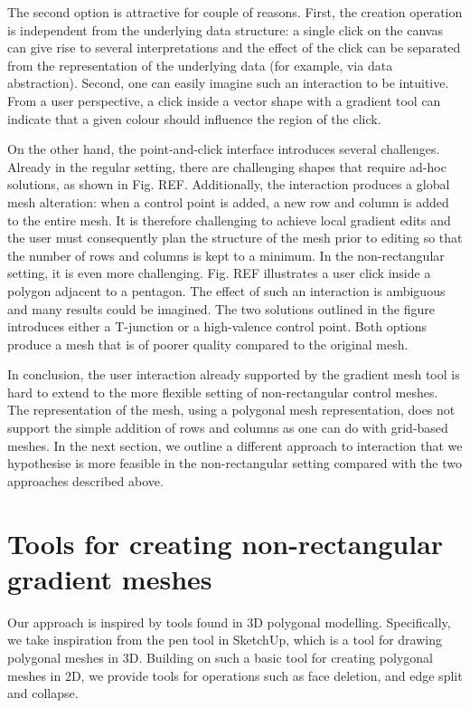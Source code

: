 \documentclass{egpubl}
\begin{document}
The second option is attractive for couple of reasons. First, the creation operation is independent from the underlying data structure: a single click on the canvas can give rise to several interpretations and the effect of the click can be separated from the representation of the underlying data (for example, via data abstraction). Second, one can easily imagine such an interaction to be intuitive. From a user perspective, a click inside a vector shape with a gradient tool can indicate that a given colour should influence the region of the click.

On the other hand, the point-and-click interface introduces several challenges. Already in the regular setting, there are challenging shapes that require ad-hoc solutions, as shown in Fig. REF. Additionally, the interaction produces a global mesh alteration: when a control point is added, a new row and column is added to the entire mesh. It is therefore challenging to achieve local gradient edits and the user must consequently plan the structure of the mesh prior to editing so that the number of rows and columns is kept to a minimum. In the non-rectangular setting, it is even more challenging. Fig. REF illustrates a user click inside a polygon adjacent to a pentagon. The effect of such an interaction is ambiguous and many results could be imagined. The two solutions outlined in the figure introduces either a T-junction or a high-valence control point. Both options produce a mesh that is of poorer quality compared to the original mesh.

In conclusion, the user interaction already supported by the gradient mesh tool is hard to extend to the more flexible setting of non-rectangular control meshes. The representation of the mesh, using a polygonal mesh representation, does not support the simple addition of rows and columns as one can do with grid-based meshes. In the next section, we outline a different approach to interaction that we hypothesise is more feasible in the non-rectangular setting compared with the two approaches described above.

\section{Tools for creating non-rectangular gradient meshes}
\label{sec:method}

Our approach is inspired by tools found in 3D polygonal modelling. Specifically, we take inspiration from the pen tool in SketchUp, which is a tool for drawing polygonal meshes in 3D. Building on such a basic tool for creating polygonal meshes in 2D, we provide tools for operations such as face deletion, and edge split and collapse.
\end{document}
